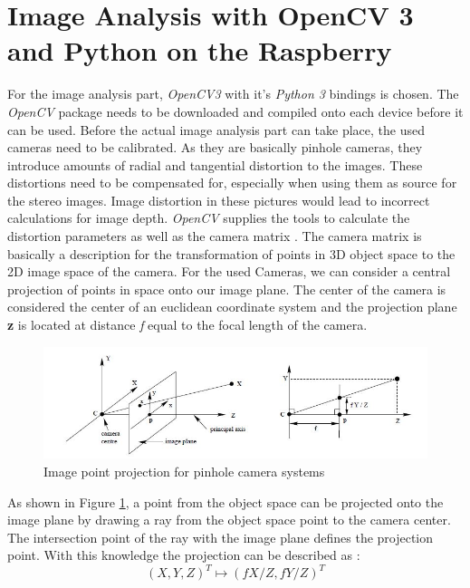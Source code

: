 \section{Image Analysis with OpenCV 3 and Python on the Raspberry}
For the image analysis part, \textit{OpenCV3} with it's \textit{Python 3} bindings is chosen. The \textit{OpenCV} package needs to be downloaded and compiled onto each device before it can be used.
Before the actual image analysis part can take place, the used cameras need to be calibrated. As they are basically pinhole cameras, they introduce amounts of radial and tangential distortion to the images. These distortions need to be compensated for, especially when using them as source for the stereo images. Image distortion in these pictures would lead to incorrect calculations for image depth.
\textit{OpenCV} supplies the tools to calculate the distortion parameters as well as the camera matrix \cite{Opencv.2018}.
The camera matrix is basically a description for the transformation of points in 3D object space to the 2D image space of the camera. For the used Cameras, we can consider a central projection of points in space onto our image plane. The center of the camera is considered the center of an euclidean coordinate system and the projection plane \textbf{z} is located at distance \textit{f} equal to the focal length of the camera.\\
\begin{figure}[H]
\includegraphics[width=\textwidth]{images/pionhole.JPG}
\caption{Image point projection for pinhole camera systems\cite{Hartley.2000}}
\label{pinholecamera_mapping} 
\end{figure}
As shown in Figure \ref{pinholecamera_mapping}, a point from the object space can be projected onto the image plane by drawing a ray from the object space point to the camera center. The intersection point of the ray with the image plane defines the projection point. With this knowledge the projection can be described as :
\begin{equation}
(X,Y,Z)^{T} \mapsto (fX/Z,fY/Z)^{T}
\end{equation}

